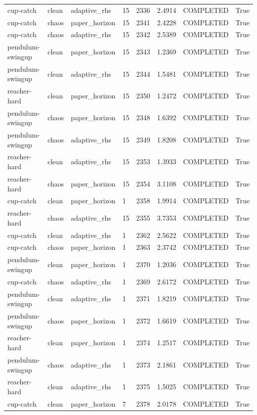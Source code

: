 \begin{tabular}{llllllll}
cup-catch & clean & adaptive\_rhs & 15 & 2336 & 2.4914 & COMPLETED & True \\
cup-catch & chaos & paper\_horizon & 15 & 2341 & 2.4228 & COMPLETED & True \\
cup-catch & chaos & adaptive\_rhs & 15 & 2342 & 2.5389 & COMPLETED & True \\
pendulum-swingup & clean & paper\_horizon & 15 & 2343 & 1.2369 & COMPLETED & True \\
pendulum-swingup & clean & adaptive\_rhs & 15 & 2344 & 1.5481 & COMPLETED & True \\
reacher-hard & clean & paper\_horizon & 15 & 2350 & 1.2472 & COMPLETED & True \\
pendulum-swingup & chaos & paper\_horizon & 15 & 2348 & 1.6392 & COMPLETED & True \\
pendulum-swingup & chaos & adaptive\_rhs & 15 & 2349 & 1.8208 & COMPLETED & True \\
reacher-hard & clean & adaptive\_rhs & 15 & 2353 & 1.3933 & COMPLETED & True \\
reacher-hard & chaos & paper\_horizon & 15 & 2354 & 3.1108 & COMPLETED & True \\
cup-catch & clean & paper\_horizon & 1 & 2358 & 1.9914 & COMPLETED & True \\
reacher-hard & chaos & adaptive\_rhs & 15 & 2355 & 3.7353 & COMPLETED & True \\
cup-catch & clean & adaptive\_rhs & 1 & 2362 & 2.5622 & COMPLETED & True \\
cup-catch & chaos & paper\_horizon & 1 & 2363 & 2.3742 & COMPLETED & True \\
pendulum-swingup & clean & paper\_horizon & 1 & 2370 & 1.2036 & COMPLETED & True \\
cup-catch & chaos & adaptive\_rhs & 1 & 2369 & 2.6172 & COMPLETED & True \\
pendulum-swingup & clean & adaptive\_rhs & 1 & 2371 & 1.8219 & COMPLETED & True \\
pendulum-swingup & chaos & paper\_horizon & 1 & 2372 & 1.6619 & COMPLETED & True \\
reacher-hard & clean & paper\_horizon & 1 & 2374 & 1.2517 & COMPLETED & True \\
pendulum-swingup & chaos & adaptive\_rhs & 1 & 2373 & 2.1861 & COMPLETED & True \\
reacher-hard & clean & adaptive\_rhs & 1 & 2375 & 1.5025 & COMPLETED & True \\
cup-catch & clean & paper\_horizon & 7 & 2378 & 2.0178 & COMPLETED & True \\

\end{tabular}
